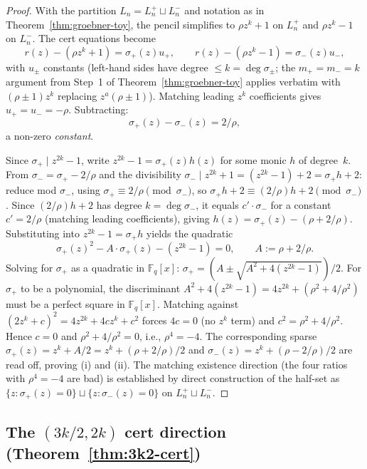 \documentclass[11pt]{article}
\theoremstyle{definition}
\theoremstyle{remark}
\newcommand{\FF}{\mathbb{F}}
\begin{document}
\begin{proof}
With the partition $L_n = L_n^+ \sqcup L_n^-$ and notation as in
Theorem~\ref{thm:groebner-toy}, the pencil simplifies to
$\rho z^k + 1$ on $L_n^+$ and $\rho z^k - 1$ on $L_n^-$. The cert
equations become
\[
 r(z) - (\rho z^k + 1) = \sigma_+(z) u_+, \qquad
 r(z) - (\rho z^k - 1) = \sigma_-(z) u_-,
\]
with $u_\pm$ constants (left-hand sides have degree $\leq k = \deg
\sigma_\pm$; the $m_+ = m_- = k$ argument from Step~1 of
Theorem~\ref{thm:groebner-toy} applies verbatim with
$(\rho \pm 1) z^k$ replacing $z^a(\rho \pm 1)$). Matching leading $z^k$
coefficients gives $u_+ = u_- = -\rho$. Subtracting:
\begin{equation}
\label{eq:k2k-sigma-diff}
 \sigma_+(z) - \sigma_-(z) = 2/\rho,
\end{equation}
a non-zero \emph{constant}.

Since $\sigma_+ \mid z^{2k} - 1$, write $z^{2k} - 1 = \sigma_+(z) h(z)$
for some monic $h$ of degree~$k$. From $\sigma_- = \sigma_+ - 2/\rho$
and the divisibility $\sigma_- \mid z^{2k} + 1 = (z^{2k} - 1) + 2 =
\sigma_+ h + 2$: reduce mod $\sigma_-$, using $\sigma_+ \equiv 2/\rho
\pmod{\sigma_-}$, so $\sigma_+ h + 2 \equiv (2/\rho) h + 2 \pmod{\sigma_-}$.
Since $(2/\rho) h + 2$ has degree $k = \deg \sigma_-$, it equals
$c' \cdot \sigma_-$ for a constant $c' = 2/\rho$ (matching leading
coefficients), giving $h(z) = \sigma_+(z) - (\rho + 2/\rho)$.
Substituting into $z^{2k} - 1 = \sigma_+ h$ yields the quadratic
\[
 \sigma_+(z)^2 - A \cdot \sigma_+(z) - (z^{2k} - 1) = 0,
 \qquad A := \rho + 2/\rho.
\]
Solving for $\sigma_+$ as a quadratic in $\FF_q[x]$:
$\sigma_+ = (A \pm \sqrt{A^2 + 4(z^{2k} - 1)}) / 2$. For $\sigma_+$ to
be a polynomial, the discriminant
$A^2 + 4(z^{2k} - 1) = 4 z^{2k} + (\rho^2 + 4/\rho^2)$ must be a perfect
square in $\FF_q[x]$. Matching against $(2 z^k + c)^2 = 4 z^{2k} + 4 c
z^k + c^2$ forces $4c = 0$ (no $z^k$ term) and $c^2 = \rho^2 +
4/\rho^2$. Hence $c = 0$ and $\rho^2 + 4/\rho^2 = 0$, i.e.,
$\boxed{\rho^4 = -4}$. The corresponding sparse $\sigma_+(z) = z^k +
A/2 = z^k + (\rho + 2/\rho)/2$ and $\sigma_-(z) = z^k + (\rho -
2/\rho)/2$ are read off, proving (i) and (ii). The matching existence
direction (the four ratios with $\rho^4 = -4$ are bad) is established
by direct construction of the half-set as $\{z : \sigma_+(z) = 0\}
\sqcup \{z : \sigma_-(z) = 0\}$ on $L_n^+ \sqcup L_n^-$.
\end{proof}

\subsection{The $(3k/2, 2k)$ cert direction (Theorem~\ref{thm:3k2-cert})}
\label{prf:thm:3k2-cert}
\end{document}
